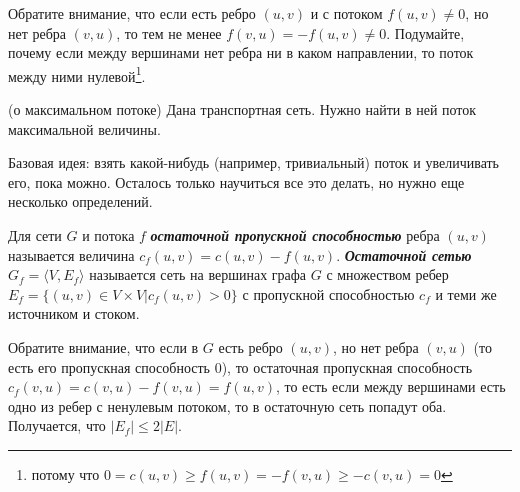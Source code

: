 Обратите внимание, что если есть ребро $(u,v)$ и с потоком $f(u,v)\ne0$, но нет ребра $(v,u)$, то тем не менее $f(v,u)=-f(u,v)\ne0$. Подумайте, почему если между вершинами нет ребра ни в каком направлении, то поток между ними нулевой\footnote{потому что $0=c(u,v)\ge f(u,v)=-f(v,u)\ge -c(v,u)=0$}.
\begin{problem}(о максимальном потоке)
	Дана транспортная сеть. Нужно найти в ней поток максимальной величины.
\end{problem}
Базовая идея: взять какой-нибудь (например, тривиальный) поток и увеличивать его, пока можно. Осталось только научиться все это делать, но нужно еще несколько определений.
\begin{definition}
	Для сети $G$ и потока $f$ {\bf\it остаточной пропускной способностью} ребра $(u,v)$ называется величина $c_f(u,v)=c(u,v)-f(u,v)$. {\bf\it Остаточной сетью} $G_f=\langle V,E_f\rangle$ называется сеть на вершинах графа $G$ с множеством ребер $E_f=\{(u,v)\in V\times V|c_f(u,v)>0\}$ с пропускной способностью $c_f$ и теми же источником и стоком.
\end{definition}

Обратите внимание, что если в $G$ есть ребро $(u,v)$, но нет ребра $(v,u)$ (то есть его пропускная способность 0), то остаточная пропускная способность $c_f(v,u)=c(v,u)-f(v,u)=f(u,v)$, то есть если между вершинами есть одно из ребер с ненулевым потоком, то в остаточную сеть попадут оба.
Получается, что $|E_f|\le 2|E|$\label{someshit6}.

